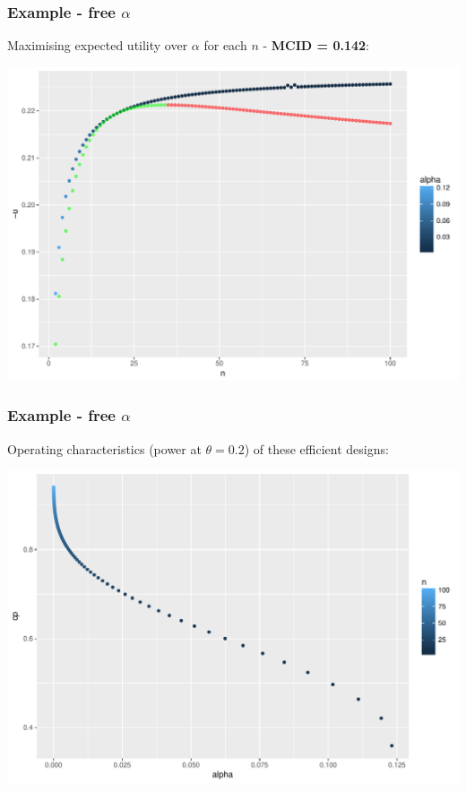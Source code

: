 \documentclass{beamer}
\begin{document}
\begin{frame}
\frametitle{Example - free $\alpha$}
Maximising expected utility over $\alpha$ for each $n$ - \textbf{MCID = 0.142}:

\centering
\includegraphics[scale=0.4]{free_a_142}
\end{frame}

\begin{frame}
\frametitle{Example - free $\alpha$}
Operating characteristics (power at $\theta = 0.2$) of these efficient designs:

\centering
\includegraphics[scale=0.4]{OCs}
\end{frame}
\end{document}
